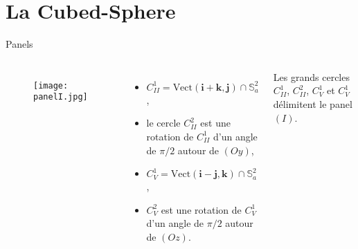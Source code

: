 \documentclass[11pt]{beamer}
\def\Vect{\text{Vect}}
\begin{document}
\section{La Cubed-Sphere}
\begin{frame}{Panels}
\begin{columns}
\begin{figure}[htbp]
\begin{center}
\texttt{[image: panelI.jpg]}
\end{center}
\end{figure}

\begin{itemize}
\item $C_{II}^1 = \Vect(\mathbf{i}+\mathbf{k}, \mathbf{j}) \cap \mathbb{S}_a^2$,
\item le cercle $C_{II}^2$ est une rotation de $C_{II}^1$ d'un angle de $\pi/2$ autour de $(Oy)$,
\item $C_V^1 = \Vect(\mathbf{i}-\mathbf{j}, \mathbf{k}) \cap \mathbb{S}_a^2$,
\item $C_V^2$ est une rotation de $C_V^1$ d'un angle de $\pi/2$ autour de $(Oz)$.
\end{itemize}

\begin{block}{}
Les grands cercles $C_{II}^1$, $C_{II}^2$, $C_V^1$ et $C_V^1$ délimitent le panel $(I)$.
\end{block}
\end{columns}
\end{frame}
\end{document}
